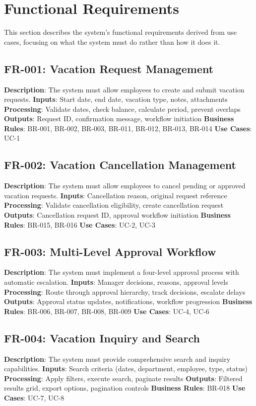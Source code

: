 \documentclass[12pt,a4paper]{article}
\begin{document}
\section{Functional Requirements}

This section describes the system's functional requirements derived from use cases, focusing on what the system must do rather than how it does it.

\subsection{FR-001: Vacation Request Management}
\textbf{Description}: The system must allow employees to create and submit vacation requests.
\textbf{Inputs}: Start date, end date, vacation type, notes, attachments
\textbf{Processing}: Validate dates, check balance, calculate period, prevent overlaps
\textbf{Outputs}: Request ID, confirmation message, workflow initiation
\textbf{Business Rules}: BR-001, BR-002, BR-003, BR-011, BR-012, BR-013, BR-014
\textbf{Use Cases}: UC-1

\subsection{FR-002: Vacation Cancellation Management}
\textbf{Description}: The system must allow employees to cancel pending or approved vacation requests.
\textbf{Inputs}: Cancellation reason, original request reference
\textbf{Processing}: Validate cancellation eligibility, create cancellation request
\textbf{Outputs}: Cancellation request ID, approval workflow initiation
\textbf{Business Rules}: BR-015, BR-016
\textbf{Use Cases}: UC-2, UC-3

\subsection{FR-003: Multi-Level Approval Workflow}
\textbf{Description}: The system must implement a four-level approval process with automatic escalation.
\textbf{Inputs}: Manager decisions, reasons, approval levels
\textbf{Processing}: Route through approval hierarchy, track decisions, escalate delays
\textbf{Outputs}: Approval status updates, notifications, workflow progression
\textbf{Business Rules}: BR-006, BR-007, BR-008, BR-009
\textbf{Use Cases}: UC-4, UC-6

\subsection{FR-004: Vacation Inquiry and Search}
\textbf{Description}: The system must provide comprehensive search and inquiry capabilities.
\textbf{Inputs}: Search criteria (dates, department, employee, type, status)
\textbf{Processing}: Apply filters, execute search, paginate results
\textbf{Outputs}: Filtered results grid, export options, pagination controls
\textbf{Business Rules}: BR-018
\textbf{Use Cases}: UC-7, UC-8
\end{document}
